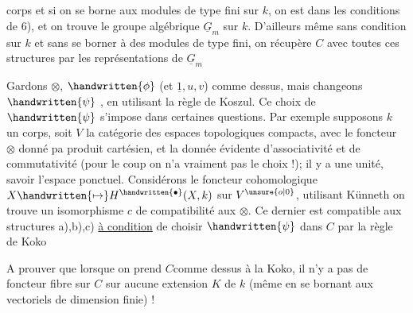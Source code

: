 

corps et si on se borne aux modules de type fini sur $k$, on est dans les conditions de 6), et on trouve le groupe algébrique $\underline{G}_m$ sur $k$. D'ailleurs même sans condition sur $k$ et sans se borner à des modules de type fini, on récupère $C$ avec toutes ces structures par les représentations de $\underline{G}_m$

Gardons $\otimes$, $\handwritten{\phi}$ (et $\underline{1},u,v$) comme dessus, mais changeons $\handwritten{\psi}$ , en  utilisant la règle de Koszul. Ce choix de $\handwritten{\psi}$ s'impose dans certaines questions. Par exemple supposons $k$ un corps,  soit $V$ la catégorie des espaces topologiques compacts, avec le foncteur $\otimes$ donné pa produit cartésien, et la donnée évidente d'associativité et de commutativité (pour le coup on n'a vraiment pas le choix !); il y a une unité,  savoir l'espace ponctuel. Considérons le foncteur cohomologique $X\handwritten{\mapsto}H^{\handwritten{\bullet}}(X,k)$ sur $V^{\unsure{o|0}}$, utilisant Künneth on trouve un isomorphisme $c$ de compatibilité aux $\otimes$. Ce dernier est compatible aux structures a),b),c) \uline{à condition} de choisir $\handwritten{\psi}$ dans $C$ par la règle de Koko\handwritten{!}

A prouver que lorsque on prend $C$comme dessus à la Koko, il n'y a pas de foncteur fibre sur $C$ sur aucune extension $K$ de $k$ (même en se bornant aux vectoriels de dimension finie) !



